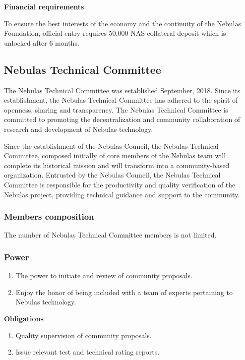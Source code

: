 \vspace{2em}

\textbf{Financial requirements}

To ensure the best interests of the economy and the continuity of the Nebulas Foundation, official entry requires 50,000 NAS collateral deposit which is unlocked after 6 months.

\subsection{Nebulas Technical Committee}

The Nebulas Technical Committee was established September, 2018. Since its establishment, the Nebulas Technical Committee has adhered to the spirit of openness, sharing and transparency. The Nebulas Technical Committee is committed to promoting the decentralization and community collaboration of research and development of Nebulas technology.

Since the establishment of the Nebulas Council, the Nebulas Technical Committee, composed initially of core members of the Nebulas team will complete its historical mission and will transform into a community-based organization. Entrusted by the Nebulas Council, the Nebulas Technical Committee is responsible for the productivity and quality verification of the Nebulas project, providing technical guidance and support to the community.

\subsubsection{Members composition}

The number of Nebulas Technical Committee members is not limited.

\subsubsection{Power}

\begin{enumerate}
	\item The power to initiate and review of community proposals.
	\item Enjoy the honor of being included with a team of experts pertaining to Nebulas technology.
\end{enumerate}

\textbf{Obligations}

\begin{enumerate}
	\item Quality supervision of community proposals.
	\item Issue relevant test and technical rating reports.
\end{enumerate}

